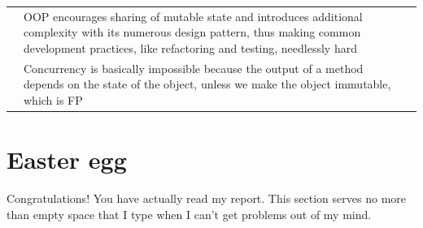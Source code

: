 \documentclass[a4paper]{article}
\numberwithin{equation}{section}
\begin{document}
\begin{center}
\begin{tabularx}{\textwidth}{l*{2}{X}}
         & OOP encourages sharing of mutable state and introduces additional complexity with its numerous design pattern, thus making common development practices, like refactoring and testing, needlessly hard &                                                                                                   \\
         & Concurrency is basically impossible because the output of a method depends on the state of the object, unless we make the object immutable, which is FP                                                &                                                                                                   \\
    \bottomrule
  \end{tabularx}
\end{center}

\newpage
\section*{Easter egg}
Congratulations! You have actually read my report.
This section serves no more than empty space that I type when I can't get problems out of my mind.
\end{document}

